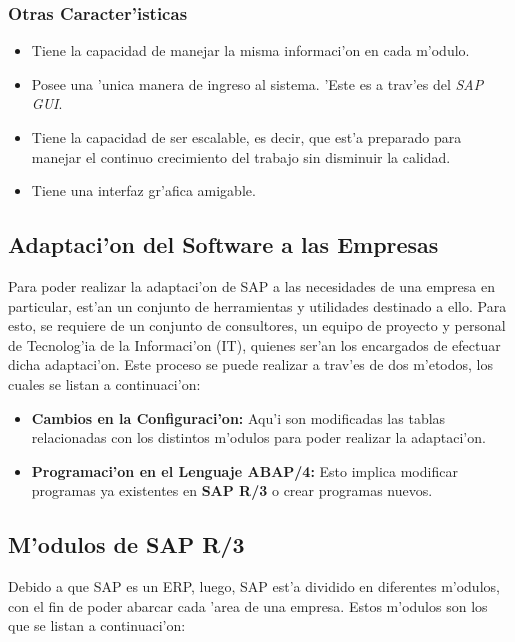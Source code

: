 \subsubsection*{Otras Caracter'isticas}
\begin{itemize}
\item Tiene la capacidad de manejar la misma informaci'on en cada m'odulo.
\item Posee una 'unica manera de ingreso al sistema. 'Este es a trav'es del \textit{SAP GUI}.
\item Tiene la capacidad de ser escalable, es decir, que est'a preparado para manejar el continuo crecimiento del trabajo sin disminuir la calidad.
\item Tiene una interfaz gr'afica amigable.
\end{itemize}

\subsection{Adaptaci'on del Software a las Empresas}
Para poder realizar la adaptaci'on de SAP a las necesidades de una empresa en particular, est'an un conjunto de herramientas y utilidades destinado a ello. Para esto, se requiere de un conjunto de consultores, un equipo de proyecto y personal de Tecnolog'ia de la Informaci'on (IT), quienes ser'an los encargados de efectuar dicha adaptaci'on. 
\newline
\newline
Este proceso se puede realizar a trav'es de dos m'etodos, los cuales se listan a continuaci'on:

\begin{itemize}
\item \textbf{Cambios en la Configuraci'on:} Aqu'i son modificadas las tablas relacionadas con los distintos m'odulos para poder realizar la adaptaci'on.
\item \textbf{Programaci'on en el Lenguaje ABAP/4:} Esto implica modificar programas ya existentes en \textbf{SAP R/3} o crear programas nuevos.
\end{itemize}

\subsection{M'odulos de SAP R/3}
Debido a que SAP es un ERP, luego, SAP est'a dividido en diferentes m'odulos, con el fin de poder abarcar cada 'area de una empresa. Estos m'odulos son los que se listan a continuaci'on:

